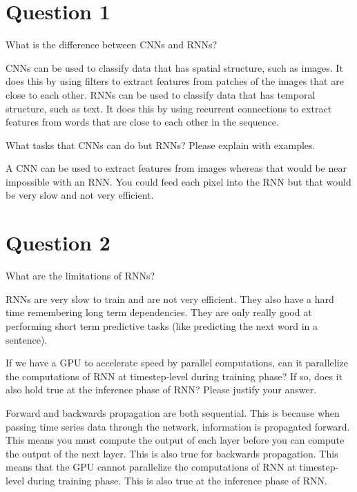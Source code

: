 \documentclass{article}
\begin{document}
\maketitle


\section{Question 1}

What is the difference between CNNs and RNNs?

CNNs can be used to classify data that has spatial structure, such as images. It does this by using filters to extract features from patches of the images that are close to each other. RNNs can be used to classify data that has temporal structure, such as text. It does this by using recurrent connections to extract features from words that are close to each other in the sequence.


What tasks that CNNs can do but RNNs? Please explain with examples.

A CNN can be used to extract features from images whereas that would be near impossible with an RNN. You could feed each pixel into the RNN but that would be very slow and not very efficient. 



\section{Question 2}

What are the limitations of RNNs?

RNNs are very slow to train and are not very efficient. They also have a hard time remembering long term dependencies. They are only really good at performing short term predictive tasks (like predicting the next word in a sentence).

If we have a GPU to accelerate speed by parallel computations, can it parallelize the computations of RNN at timestep-level during training phase? If so, does it also hold true at the inference phase of RNN?  Please justify your answer.

Forward and backwards propagation are both sequential. This is because when passing time series data through the network, information is propagated forward. This means you must compute the output of each layer before you can compute the output of the next layer. This is also true for backwards propagation. This means that the GPU cannot parallelize the computations of RNN at timestep-level during training phase. This is also true at the inference phase of RNN.
\end{document}
